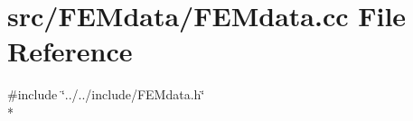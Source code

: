 \section{src/\-F\-E\-Mdata/\-F\-E\-Mdata.cc File Reference}
\label{_f_e_mdata_8cc}
{\ttfamily \#include \char`\"{}../../include/\-F\-E\-Mdata.\-h\char`\"{}}\\*
